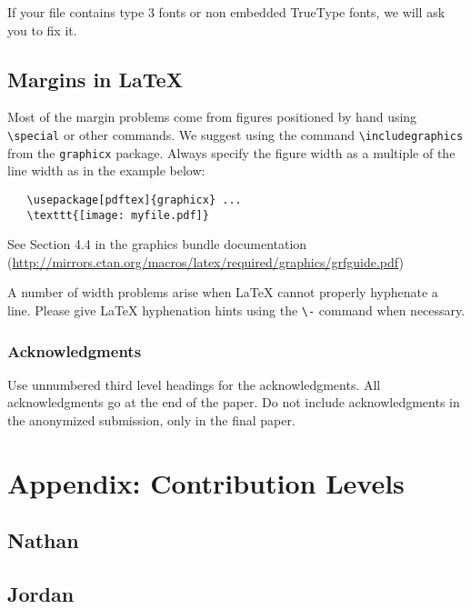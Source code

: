 \documentclass{article}
\begin{document}
If your file contains type 3 fonts or non embedded TrueType fonts, we
will ask you to fix it.

\subsection{Margins in \LaTeX{}}

Most of the margin problems come from figures positioned by hand using
\verb+\special+ or other commands. We suggest using the command
\verb+\includegraphics+ from the \verb+graphicx+ package. Always
specify the figure width as a multiple of the line width as in the
example below:
\begin{verbatim}
   \usepackage[pdftex]{graphicx} ...
   \texttt{[image: myfile.pdf]}
\end{verbatim}
See Section 4.4 in the graphics bundle documentation
(\url{http://mirrors.ctan.org/macros/latex/required/graphics/grfguide.pdf})

A number of width problems arise when \LaTeX{} cannot properly
hyphenate a line. Please give LaTeX hyphenation hints using the
\verb+\-+ command when necessary.

\subsubsection*{Acknowledgments}

Use unnumbered third level headings for the acknowledgments. All
acknowledgments go at the end of the paper. Do not include
acknowledgments in the anonymized submission, only in the final paper.

\section*{Appendix: Contribution Levels}

\subsection*{Nathan}

\subsection*{Jordan}
\end{document}
